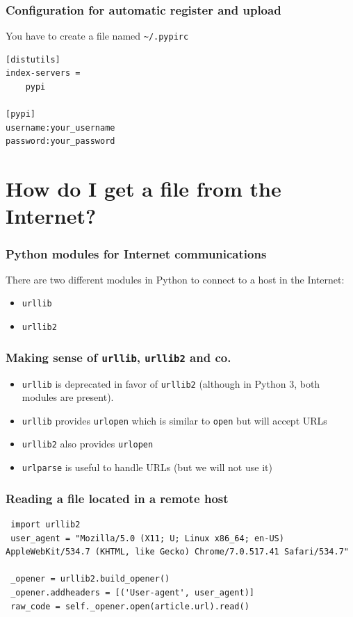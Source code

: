 \documentclass[11pt]{beamer}
\begin{document}
\begin{frame}[fragile]\frametitle{Configuration for automatic register and upload}
\label{sec-1_6}


You have to create a file named \texttt{\textasciitilde{}/.pypirc}
\begin{verbatim}
[distutils]
index-servers =
    pypi

[pypi]
username:your_username
password:your_password
\end{verbatim}
\end{frame}
\section{How do I get a file from the Internet?}
\label{sec-2}
\begin{frame}[fragile]\frametitle{Python modules for Internet communications}
\label{sec-2_1}


There are two different modules in Python to connect to a host in the Internet:
\begin{itemize}
\item \texttt{urllib}
\item \texttt{urllib2}
\end{itemize}
\end{frame}
\begin{frame}[fragile]\frametitle{Making sense of \texttt{urllib}, \texttt{urllib2} and co.}
\label{sec-2_2}

   
\begin{itemize}
\item \texttt{urllib} is deprecated in favor of \texttt{urllib2} (although in Python 3, both modules are present).
\item \texttt{urllib} provides \texttt{urlopen} which is similar to \texttt{open} but will  accept URLs
\item \texttt{urllib2} also provides \texttt{urlopen}
\item \texttt{urlparse} is useful to handle URLs (but we will not use it)
\end{itemize}
\end{frame}
\begin{frame}[fragile]\frametitle{Reading a file located in a remote host}
\label{sec-2_3}


\begin{lstlisting}
 import urllib2
 user_agent = "Mozilla/5.0 (X11; U; Linux x86_64; en-US) AppleWebKit/534.7 (KHTML, like Gecko) Chrome/7.0.517.41 Safari/534.7"

 _opener = urllib2.build_opener()
 _opener.addheaders = [('User-agent', user_agent)]
 raw_code = self._opener.open(article.url).read()
\end{lstlisting}
\end{frame}
\end{document}
